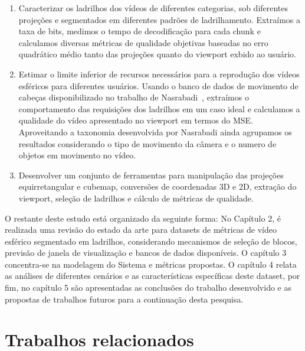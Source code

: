 \begin{enumerate}
	\item Caracterizar os ladrilhos dos vídeos de diferentes categorias, sob diferentes projeções e segmentados em diferentes padrões de ladrilhamento. Extraímos a taxa de bits, medimos o tempo de decodificação para cada chunk e calculamos diversas métricas de qualidade objetivas baseadas no erro quadrático médio tanto das projeções quanto do viewport exbido ao usuário.

	\item Estimar o limite inferior de recursos necessários para a reprodução dos vídeos esféricos para diferentes usuários. Usando o banco de dados de movimento de cabeças disponibilizado no trabalho de Nasrabadi~\cite{Nasrabadi2019}, extraímos o comportamento das requisições dos ladrilhos em um caso ideal e calculamos a qualidade do vídeo apresentado no viewport em termos do MSE. Aproveitando a taxonomia desenvolvida por Nasrabadi ainda agrupamos os resultados considerando o tipo de movimento da câmera e o numero de objetos em movimento no vídeo.

	\item Desenvolver um conjunto de ferramentas para manipulação das projeções equirretangular e cubemap, conversões de coordenadas 3D e 2D, extração do viewport, seleção de ladrilhos e cálculo de métricas de qualidade.
\end{enumerate}

O restante deste estudo está organizado da seguinte forma: No Capítulo 2, é realizada uma revisão do estado da arte para datasets de métricas de vídeo esférico segmentado em ladrilhos, considerando mecanismos de seleção de blocos, previsão de janela de visualização e bancos de dados disponíveis. O capítulo 3 concentra-se na modelagem do Sistema e métricas propostas. O capítulo 4 relata as análises de diferentes cenários e as características específicas deste dataset, por fim, no capítulo 5 são apresentadas as conclusões do trabalho desenvolvido e as propostas de trabalhos futuros para a continuação desta pesquisa.


 \chapter{Trabalhos relacionados}


